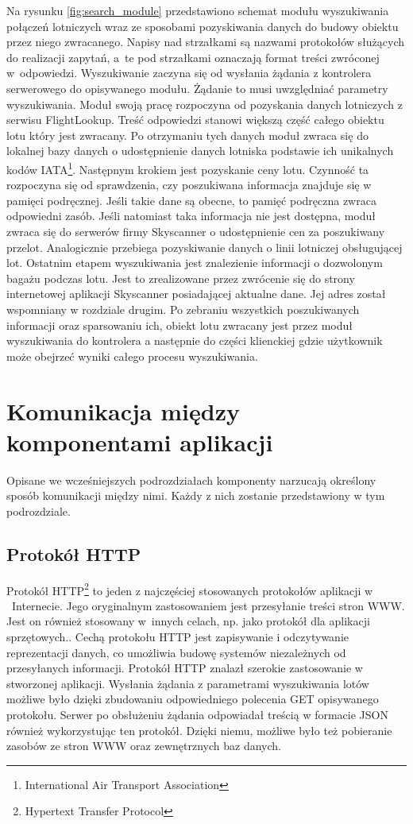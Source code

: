 \documentclass[12pt, twoside]{report}
\begin{document}
Na rysunku \ref{fig:search_module} przedstawiono schemat modułu wyszukiwania połączeń lotniczych wraz ze sposobami pozyskiwania danych do budowy obiektu przez niego zwracanego.
Napisy nad strzałkami są nazwami protokołów służących do realizacji zapytań, a~te pod strzałkami oznaczają format treści zwróconej w~odpowiedzi. Wyszukiwanie zaczyna się od wysłania żądania z kontrolera serwerowego do opisywanego modułu. Żądanie to musi uwzględniać  parametry wyszukiwania. Moduł swoją pracę rozpoczyna od pozyskania danych lotniczych z serwisu FlightLookup. Treść odpowiedzi stanowi większą część całego obiektu lotu który jest zwracany. Po otrzymaniu tych danych moduł zwraca się do lokalnej bazy danych o udostępnienie danych lotniska podstawie ich unikalnych kodów IATA\footnote{International Air Transport Association}. Następnym krokiem jest pozyskanie ceny lotu. Czynność ta rozpoczyna się od sprawdzenia, czy poszukiwana informacja znajduje się w pamięci podręcznej. Jeśli takie dane są obecne, to pamięć podręczna zwraca odpowiedni zasób. Jeśli natomiast taka informacja nie jest dostępna, moduł zwraca się do serwerów firmy Skyscanner o udostępnienie cen za poszukiwany przelot. Analogicznie przebiega pozyskiwanie danych o linii lotniczej obsługującej lot. Ostatnim etapem wyszukiwania jest znalezienie informacji o dozwolonym bagażu podczas lotu. Jest to zrealizowane przez zwrócenie się do strony internetowej aplikacji Skyscanner posiadającej aktualne dane. Jej adres został wspomniany w rozdziale drugim. Po zebraniu wszystkich poszukiwanych informacji oraz sparsowaniu ich, obiekt lotu zwracany jest przez moduł wyszukiwania do kontrolera a następnie do części klienckiej gdzie użytkownik może obejrzeć wyniki całego procesu wyszukiwania.

\section{Komunikacja między komponentami aplikacji}
Opisane we wcześniejszych podrozdziałach komponenty narzucają określony sposób komunikacji między nimi. Każdy z nich zostanie przedstawiony w tym podrozdziale.

\subsection{Protokół HTTP}
Protokół HTTP\footnote{Hypertext Transfer Protocol} to jeden z najczęściej stosowanych  protokołów aplikacji w ~Internecie. Jego oryginalnym zastosowaniem jest przesyłanie treści stron WWW. Jest on również stosowany w~innych celach, np. jako protokół dla aplikacji sprzętowych.\cite{http}. Cechą protokołu HTTP jest zapisywanie i odczytywanie reprezentacji danych, co umożliwia budowę systemów niezależnych od przesyłanych informacji. Protokół HTTP znalazł szerokie zastosowanie w stworzonej aplikacji. Wysłania żądania z parametrami wyszukiwania lotów możliwe było dzięki zbudowaniu odpowiedniego polecenia GET opisywanego protokołu. Serwer po obsłużeniu żądania odpowiadał treścią w formacie JSON również wykorzystując ten protokół. Dzięki niemu, możliwe było też pobieranie zasobów ze stron WWW oraz zewnętrznych baz danych.
 
\end{document}
